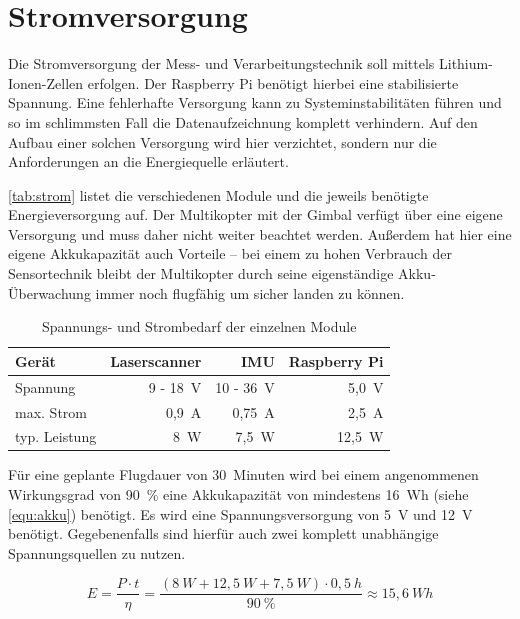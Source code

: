 \documentclass[a4paper,12pt,bibliography=totoc, listof=totoc,titlepage,pointlessnumbers]{scrreprt}
\begin{document}
\section{Strom\-ver\-sor\-gung}
Die Strom\-ver\-sor\-gung der Mess- und Ver\-arbei\-tungs\-tech\-nik soll mittels Lithium-Ionen-Zellen erfolgen. Der Rasp\-berry Pi benötigt hierbei eine stabilisierte Spannung. Eine fehlerhafte Ver\-sor\-gung kann zu Sys\-tem\-in\-sta\-bi\-li\-täten füh\-ren und so im schlimmsten Fall die Datenaufzeichnung komplett verhindern. Auf den Aufbau einer solchen Versorgung wird hier verzichtet, sondern nur die Anforderungen an die Energiequelle erläutert.

\autoref{tab:strom} listet die verschiedenen Module und die jeweils benötigte Energieversorgung auf. Der Multikopter mit der Gimbal verfügt über eine eigene Versorgung und muss daher nicht weiter beachtet werden. Außerdem hat hier eine eigene Akkukapazität auch Vorteile -- bei einem zu hohen Verbrauch der Sensortechnik bleibt der Multikopter durch seine eigenständige Akku-Überwachung immer noch flugfähig um sicher landen zu können.

\begin{table}
\centering
\begin{tabular}{ l | r | r | r }
  Gerät 	& Laser\-scan\-ner	& IMU		& Rasp\-berry Pi\\
  \hline
  Spannung 	& 9 - 18~V 	& 10 - 36~V	& 5,0~V \\
  \hline
  max. Strom 	& 0,9~A		& 0,75~A	& 2,5~A \\
  \hline
  typ. Leistung	& 8~W		& 7,5~W		& 12,5~W 
\end{tabular}
\caption{Spannungs- und Strombedarf der einzelnen Module \citep{vlpSheet,imar,raspSheet}}
\label{tab:strom}
\end{table}

Für eine geplante Flugdauer von 30~Minuten wird bei einem angenommenen Wirkungsgrad von 90~\% eine Akkukapazität von mindestens 16~Wh (siehe \autoref{equ:akku}) benötigt. Es wird eine Spannungsversorgung von 5~V und 12~V benötigt. Gegebenenfalls sind hierfür auch zwei komplett unabhängige Spannungsquellen zu nutzen.

\begin{equation}
\label{equ:akku}
E = \frac{ P \cdot t}{\eta} = \frac{(8~W + 12,5~W + 7,5~W) \cdot 0,5~h}{90~\%} \approx 15,6~Wh
\end{equation}
\end{document}
